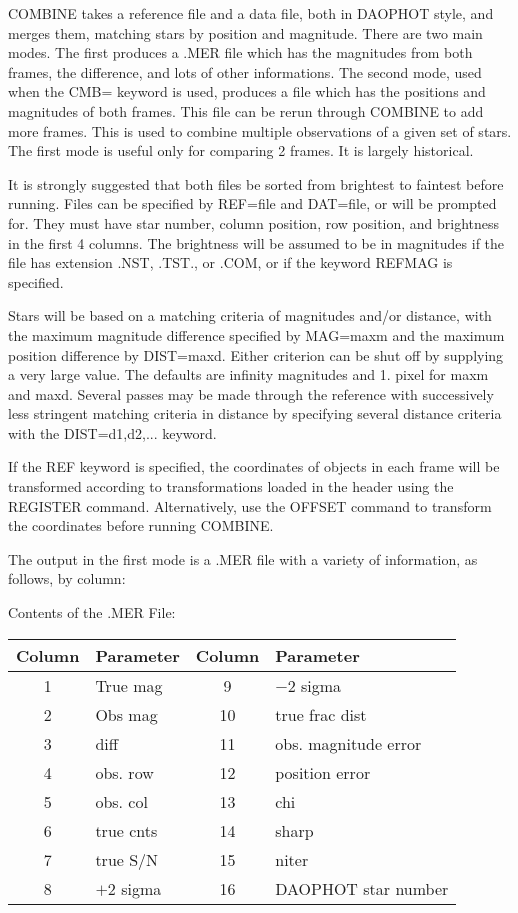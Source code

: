 COMBINE takes a reference file and a data file, both in DAOPHOT style, and
merges them, matching stars by position and magnitude. There are two main
modes. The first produces a .MER file which has the magnitudes from both
frames, the difference, and lots of other informations. The second mode,
used when the CMB= keyword is used, produces a file which has the positions
and magnitudes of both frames. This file can be rerun through COMBINE to
add more frames. This is used to combine multiple observations of a given
set of stars. The first mode is useful only for comparing 2 frames. It is
largely historical.

It is strongly suggested that both files be sorted from brightest to
faintest before running. Files can be specified by REF=file and DAT=file,
or will be prompted for. They must have star number, column position, row
position, and brightness in the first 4 columns. The brightness will be
assumed to be in magnitudes if the file has extension .NST, .TST., or .COM,
or if the keyword REFMAG is specified.

Stars will be based on a matching criteria of magnitudes and/or distance,
with the maximum magnitude difference specified by MAG=maxm and the maximum
position difference by DIST=maxd. Either criterion can be shut off by
supplying a very large value. The defaults are infinity magnitudes and
1. pixel for maxm and maxd. Several passes may be made through the
reference with successively less stringent matching criteria in distance by
specifying several distance criteria with the DIST=d1,d2,... keyword.
   
If the REF keyword is specified, the coordinates of objects in each frame
will be transformed according to transformations loaded in the header using
the REGISTER command. Alternatively, use the OFFSET command to transform
the coordinates before running COMBINE.

The output in the first mode is a .MER file with a variety of information, 
as follows, by column: 

\begin{center}
Contents of the .MER File: \\
\begin{tabular}{|cl|cl|}
\hline
Column&Parameter&Column&Parameter\\
\hline
1 & True mag  & 9 & $-$2 sigma           \\
2 & Obs mag   & 10& true frac dist       \\
3 & diff      & 11& obs. magnitude error \\
4 & obs. row  & 12& position error       \\
5 & obs. col  & 13& chi                  \\
6 & true cnts & 14& sharp                \\
7 & true S/N  & 15& niter                \\
8 & $+$2 sigma& 16& DAOPHOT star number  \\
\hline
\end{tabular}
\end{center}

